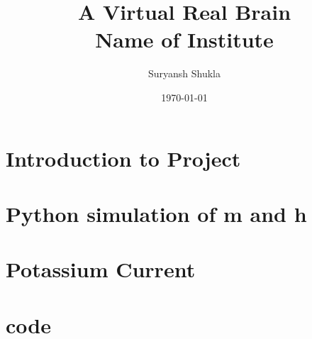 \documentclass[12pt,twoside]{report}
\title{
{A Virtual Real Brain}\\
{\large Name of Institute}\\
}
\author{Suryansh Shukla}
\date{\today}
\begin{document}
\maketitle

\tableofcontents
\listoffigures
\listoftables

\chapter{Introduction to Project}


\chapter{Python simulation of m and h}


\chapter{Potassium Current}


\chapter{code}




\newpage


\end{document}
